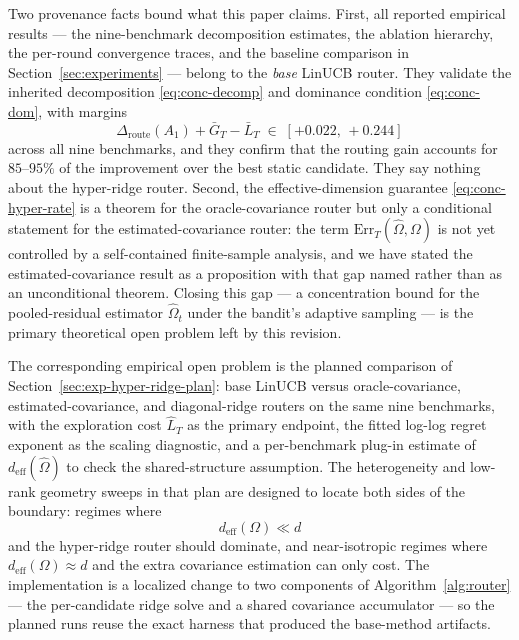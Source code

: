 \documentclass{article} %
\begin{document}
Two provenance facts bound what this paper claims. First, all reported empirical results --- the nine-benchmark decomposition estimates, the ablation hierarchy, the per-round convergence traces, and the baseline comparison in Section~\ref{sec:experiments} --- belong to the \emph{base} LinUCB router. They validate the inherited decomposition \eqref{eq:conc-decomp} and dominance condition \eqref{eq:conc-dom}, with margins
\begin{equation}
\label{eq:conc-margins}
\Delta_{\mathrm{route}}(A_1) + \bar G_T - \bar L_T \;\in\; [+0.022,\, +0.244]
\end{equation}
across all nine benchmarks, and they confirm that the routing gain accounts for $85$--$95\%$ of the improvement over the best static candidate. They say nothing about the hyper-ridge router. Second, the effective-dimension guarantee \eqref{eq:conc-hyper-rate} is a theorem for the oracle-covariance router but only a conditional statement for the estimated-covariance router: the term $\mathrm{Err}_T(\widehat\Omega,\Omega)$ is not yet controlled by a self-contained finite-sample analysis, and we have stated the estimated-covariance result as a proposition with that gap named rather than as an unconditional theorem. Closing this gap --- a concentration bound for the pooled-residual estimator $\widehat\Omega_t$ under the bandit's adaptive sampling --- is the primary theoretical open problem left by this revision.

The corresponding empirical open problem is the planned comparison of Section~\ref{sec:exp-hyper-ridge-plan}: base LinUCB versus oracle-covariance, estimated-covariance, and diagonal-ridge routers on the same nine benchmarks, with the exploration cost $\widehat L_T$ as the primary endpoint, the fitted log-log regret exponent as the scaling diagnostic, and a per-benchmark plug-in estimate of $d_{\mathrm{eff}}(\widehat\Omega)$ to check the shared-structure assumption. The heterogeneity and low-rank geometry sweeps in that plan are designed to locate both sides of the boundary: regimes where
\begin{equation}
\label{eq:conc-regime}
d_{\mathrm{eff}}(\Omega) \ll d
\end{equation}
and the hyper-ridge router should dominate, and near-isotropic regimes where $d_{\mathrm{eff}}(\Omega)\approx d$ and the extra covariance estimation can only cost. The implementation is a localized change to two components of Algorithm~\ref{alg:router} --- the per-candidate ridge solve and a shared covariance accumulator --- so the planned runs reuse the exact harness that produced the base-method artifacts.
\end{document}

